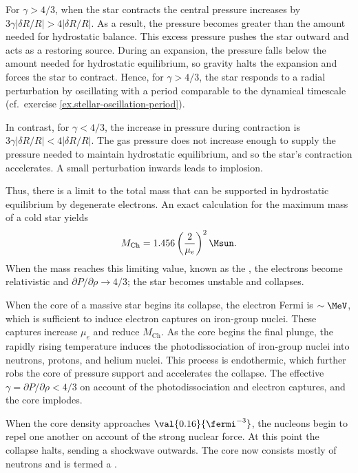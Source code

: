 \begin{sidebar}
For $\gamma > 4/3$, when the star contracts the central pressure increases by $3\gamma|\delta R/R| > 4|\delta R/R|$. As a result, the pressure becomes greater than the amount needed for hydrostatic balance. This excess pressure pushes the star outward and acts as a restoring source. During an expansion, the pressure falls below the amount needed for hydrostatic equilibrium, so gravity halts the expansion and forces the star to contract. Hence, for $\gamma > 4/3$, the star responds to a radial perturbation by oscillating with a period comparable to the dynamical timescale (cf.\ exercise \ref{ex.stellar-oscillation-period}).

In contrast, for $\gamma < 4/3$, the increase in pressure during contraction is $3\gamma|\delta R/R| < 4|\delta R/R|$. The gas pressure does not increase enough to supply the pressure needed to maintain hydrostatic equilibrium, and so the star's contraction accelerates. A small perturbation inwards leads to implosion.
\end{sidebar}

Thus, there is a limit to the total mass that can be supported in hydrostatic equilibrium by degenerate electrons. 
An exact calculation for the maximum mass of a cold star yields
\begin{equation}\label{e.Chandrasekhar}
	M_{\mathrm{Ch}} = 1.456 \left(\frac{2}{\mu_{e}}\right)^{2}\Msun.
\end{equation}
When the mass reaches this limiting value, known as the , the electrons become relativistic and $\partial P/\partial \rho \to 4/3$; the star becomes unstable and collapses.

When the core of a massive star begins its collapse, the electron Fermi is $\sim\MeV$, which is sufficient to induce electron captures on iron-group nuclei. These captures increase $\mu_{e}$ and reduce $M_{\mathrm{Ch}}$. As the core begins the final plunge, the rapidly rising temperature induces the photodissociation of iron-group nuclei into neutrons, protons, and helium nuclei. This process is endothermic, which further robs the core of pressure support and accelerates the collapse. The effective $\gamma = \partial P/\partial\rho < 4/3$ on account of the photodissociation and electron captures, and the core implodes.

When the core density approaches $\val{0.16}{\fermi^{-3}}$, the nucleons begin to repel one another on account of the strong nuclear force. At this point the collapse halts, sending a shockwave outwards. The core now consists mostly of neutrons and is termed a .

